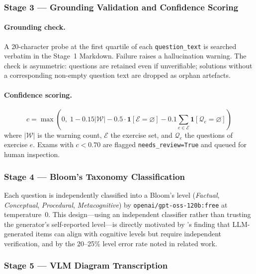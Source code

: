 \documentclass[12pt, a4paper]{article}
\begin{document}
\subsubsection{Stage 3 --- Grounding Validation and Confidence Scoring}
\label{subsubsec:stage3}

\paragraph{Grounding check.}
A 20-character probe at the first quartile of each \texttt{question\_text} is searched
verbatim in the Stage~1 Markdown. Failure raises a hallucination warning. The check
is asymmetric: questions are retained even if unverifiable; solutions without a
corresponding non-empty question text are dropped as orphan artefacts.

\paragraph{Confidence scoring.}
\begin{equation}
  c = \max\!\left(0,\; 1 - 0.15|\mathcal{W}|
      - 0.5\cdot\mathbf{1}[\mathcal{E}{=}\varnothing]
      - 0.1\!\sum_{e\in\mathcal{E}}\mathbf{1}[\mathcal{Q}_e{=}\varnothing]\right)
  \label{eq:confidence}
\end{equation}
where $|\mathcal{W}|$ is the warning count, $\mathcal{E}$ the exercise set, and
$\mathcal{Q}_e$ the questions of exercise $e$. Exams with $c < 0.70$ are flagged
\texttt{needs\_review=True} and queued for human inspection.

\subsubsection{Stage 4 --- Bloom's Taxonomy Classification}
\label{subsubsec:stage4}

Each question is independently classified into a Bloom's level
(\textit{Factual}, \textit{Conceptual}, \textit{Procedural}, \textit{Metacognitive})
by \texttt{openai/gpt-oss-120b:free} at temperature~0.
This design---using an independent classifier rather than trusting the generator's
self-reported level---is directly motivated by \citet{meissner2024itemforge}'s
finding that LLM-generated items can align with cognitive levels but require
independent verification, and by the 20--25\% level error rate noted in related work.

\subsubsection{Stage 5 --- VLM Diagram Transcription}
\label{subsubsec:stage5}
\end{document}
